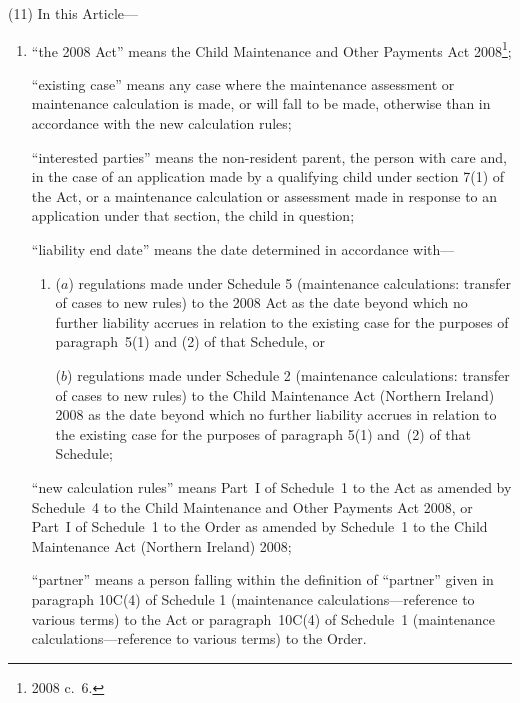 \documentclass[12pt,a4paper]{article}
\begin{document}
(11) In this Article---
\begin{enumerate}\item[]
``the 2008 Act'' means the Child Maintenance and Other Payments Act 2008\footnote{2008 c.~6.};

``existing case'' means any case where the maintenance assessment or maintenance calculation is made, or will fall to be made, otherwise than in accordance with the new calculation rules;

``interested parties'' means the non-resident parent, the person with care and, in
the case of an application made by a qualifying child under section 7(1) of the
Act, or a maintenance calculation or assessment made in response to an
application under that section, the child in question;

``liability end date'' means the date determined in accordance with---
\begin{enumerate}\item[]
($a$) regulations made under Schedule 5 (maintenance calculations: transfer
of cases to new rules) to the 2008 Act as the date beyond which no 
further liability accrues in relation to the existing case for the purposes
of paragraph~5(1) and (2) of that Schedule, or

($b$) regulations made under Schedule 2 (maintenance calculations: transfer
of cases to new rules) to the Child Maintenance Act (Northern Ireland)
2008 as the date beyond which no further liability accrues in relation to
the existing case for the purposes of paragraph 5(1) and~(2) of that
Schedule;
\end{enumerate}

``new calculation rules'' means Part~I of Schedule~1 to the Act as amended by Schedule~4 to the Child Maintenance and Other Payments Act 2008, or Part~I of Schedule~1 to the Order as amended by Schedule~1 to the Child Maintenance Act (Northern Ireland) 2008;

``partner'' means a person falling within the definition of ``partner'' given in paragraph 10C(4) of Schedule 1 (maintenance calculations---reference to various terms) to the Act or paragraph~10C(4) of Schedule~1 (maintenance calculations---reference to various terms) to the Order.
\end{enumerate}
\end{document}
